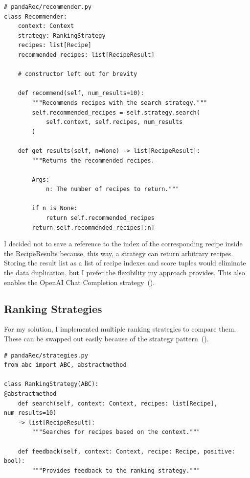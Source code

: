 \documentclass[
     12pt,                    %
     a4paper,             %
     BCOR=10mm,     %
     DIV=14,                 %
     listof=totoc,                    %
     bibliography=totoc,       %
     index=totoc,              %
     twoside,
     headsepline
     ]{scrreprt}
\begin{document}
\begin{listing}[htb]
\begin{verbatim}
# pandaRec/recommender.py
class Recommender:
	context: Context
	strategy: RankingStrategy
	recipes: list[Recipe]
	recommended_recipes: list[RecipeResult]
	
	# constructor left out for brevity
	
	def recommend(self, num_results=10):
		"""Recommends recipes with the search strategy."""
		self.recommended_recipes = self.strategy.search(
			self.context, self.recipes, num_results
		)
	
	def get_results(self, n=None) -> list[RecipeResult]:
		"""Returns the recommended recipes.
		
		Args:
			n: The number of recipes to return."""
		
		if n is None:
			return self.recommended_recipes
		return self.recommended_recipes[:n]
\end{verbatim}
\caption[Recommender Class]{Recommender Class\label{list:recommend}.}
\end{listing}

I decided not to save a reference to the index of the corresponding recipe inside the RecipeResults because, this way, a strategy can return arbitrary recipes. Storing the result list as a list of recipe indexes and score tuples would eliminate the data duplication, but I prefer the flexibility my approach provides. This also enables the OpenAI Chat Completion strategy~().

\subsection{Ranking Strategies}

For my solution, I implemented multiple ranking strategies to compare them. These can be swapped out easily because of the strategy pattern~().


\begin{listing}[htb]
\begin{verbatim}
# pandaRec/strategies.py
from abc import ABC, abstractmethod

class RankingStrategy(ABC):
@abstractmethod
	def search(self, context: Context, recipes: list[Recipe], num_results=10)
	-> list[RecipeResult]:
		"""Searches for recipes based on the context."""
		
	def feedback(self, context: Context, recipe: Recipe, positive: bool):
		"""Provides feedback to the ranking strategy."""
		
\end{verbatim}
\caption[RankingStrategy Abstract Class]{RankingStrategy Abstract Class.\label{list:strategy}}
\end{listing}
\end{document}
